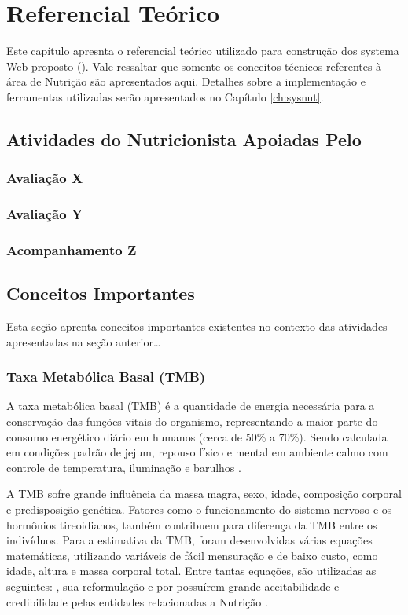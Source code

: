\chapter{Referencial Teórico} \label{ch:referencial}

{\color{red}
Este capítulo apresnta o referencial teórico utilizado para construção dos systema Web proposto (\SysNut). Vale ressaltar que somente os conceitos técnicos referentes à área de Nutrição são apresentados aqui. Detalhes sobre a implementação e ferramentas utilizadas serão apresentados no Capítulo \ref{ch:sysnut}.
}

\section{Atividades do Nutricionista Apoiadas Pelo \SysNut}

{\color{red}
\subsection{Avaliação X}
\subsection{Avaliação Y}
\subsection{Acompanhamento Z}

\section{Conceitos Importantes}

Esta seção aprenta conceitos importantes existentes no contexto das atividades apresentadas na seção anterior\ldots
}


\subsection{Taxa Metabólica Basal (TMB)}

A taxa metabólica basal (TMB) é a quantidade de energia necessária para a
conservação das funções vitais do organismo, representando a maior parte do
consumo energético diário em humanos (cerca de 50\% a 70\%). Sendo calculada em
condições padrão de jejum, repouso físico e mental em ambiente calmo com controle
de temperatura, iluminação e barulhos \cite{ruiz} \cite{harris1}.

A TMB sofre grande influência da massa magra, sexo, idade, composição
corporal e predisposição genética. Fatores como o funcionamento do sistema nervoso
e os hormônios tireoidianos, também contribuem para diferença da TMB entre os
indivíduos. Para a estimativa da TMB, foram desenvolvidas várias equações
matemáticas, utilizando variáveis de fácil mensuração e de baixo custo, como idade,
altura e massa corporal total. Entre tantas equações, são utilizadas as seguintes:
, sua reformulação  e  por possuírem grande
aceitabilidade e credibilidade pelas entidades relacionadas a Nutrição \cite{weijs}.

